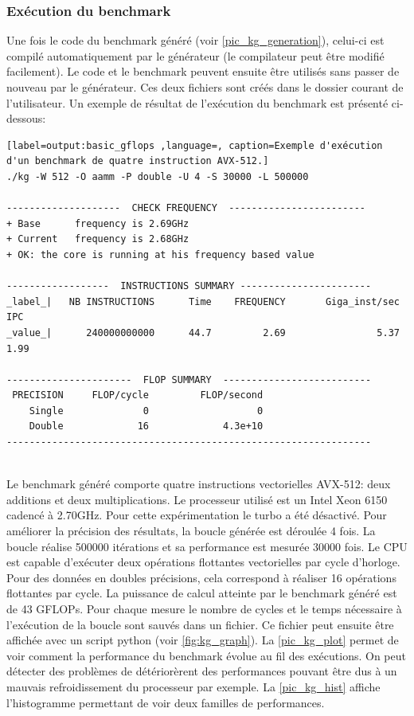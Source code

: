     \subsubsection{Exécution du benchmark}

        Une fois le code du benchmark généré (voir \autoref{pic_kg_generation}), celui-ci est compilé automatiquement par le générateur (le compilateur peut être modifié facilement). Le code et le benchmark peuvent ensuite être utilisés  sans passer de nouveau par le générateur. Ces deux fichiers sont créés dans le dossier courant de l'utilisateur. Un exemple de résultat de l'exécution du benchmark est présenté ci-dessous:
    
    
 \begin{lstlisting}[label=output:basic_gflops ,language=, caption=Exemple d'exécution d'un benchmark de quatre instruction AVX-512.]
./kg -W 512 -O aamm -P double -U 4 -S 30000 -L 500000

--------------------  CHECK FREQUENCY  ------------------------
+ Base      frequency is 2.69GHz
+ Current   frequency is 2.68GHz
+ OK: the core is running at his frequency based value

------------------  INSTRUCTIONS SUMMARY -----------------------
_label_|   NB INSTRUCTIONS      Time    FREQUENCY       Giga_inst/sec       IPC
_value_|      240000000000      44.7         2.69                5.37      1.99

----------------------  FLOP SUMMARY  --------------------------
 PRECISION     FLOP/cycle         FLOP/second
    Single              0                   0
    Double             16             4.3e+10
----------------------------------------------------------------


\end{lstlisting}   
    
        Le benchmark généré comporte quatre instructions vectorielles AVX-512: deux additions et deux multiplications. Le processeur utilisé est un  Intel Xeon 6150 cadencé à 2.70GHz. Pour cette expérimentation le turbo a été désactivé. Pour améliorer la précision des résultats, la boucle générée est déroulée 4 fois. La boucle réalise 500000 itérations et sa performance est mesurée 30000 fois. Le CPU est capable d'exécuter deux opérations flottantes vectorielles par cycle d'horloge. Pour des données en doubles précisions, cela correspond à réaliser 16 opérations flottantes par cycle. La puissance de calcul atteinte par le benchmark généré est de 43 GFLOPs. Pour chaque mesure le nombre de cycles et le temps nécessaire à l'exécution de la boucle sont sauvés dans un fichier. Ce fichier peut ensuite être affichée avec un script python (voir \autoref{fig:kg_graph}). La \autoref{pic_kg_plot} permet de voir comment la performance du benchmark évolue au fil des exécutions. On peut détecter des problèmes de détériorèrent des performances pouvant être dus à un mauvais refroidissement du processeur par exemple.  La \autoref{pic_kg_hist} affiche l'histogramme permettant de voir deux familles de performances.
        

